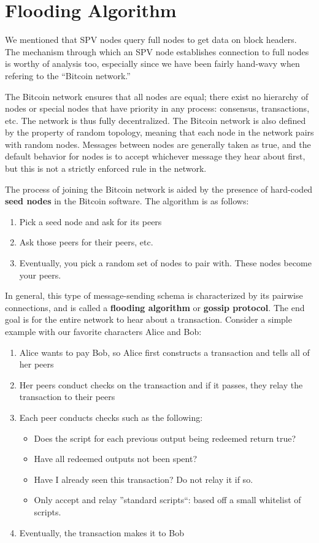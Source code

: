 \documentclass[11pt]{article}
\begin{document}
 \section*{Flooding Algorithm}
 
 We mentioned that SPV nodes query full nodes to get data on block headers. The mechanism through which an SPV node establishes connection to full nodes is worthy of analysis too, especially since we have been fairly hand-wavy when refering to the ``Bitcoin network.''
 
 The Bitcoin network ensures that all nodes are equal; there exist no hierarchy of nodes or special nodes that have priority in any process: consensus, transactions, etc. The network is thus fully decentralized. The Bitcoin network is also defined by the property of random topology, meaning that each node in the network pairs with random nodes. Messages between nodes are generally taken as true, and the default behavior for nodes is to accept whichever message they hear about first, but this is not a strictly enforced rule in the network.
 
 The process of joining the Bitcoin network is aided by the presence of hard-coded \textbf{seed nodes} in the Bitcoin software. The algorithm is as follows:
 \begin{enumerate}
     \item Pick a seed node and ask for its peers
     \item Ask those peers for their peers, etc.
     \item Eventually, you pick a random set of nodes to pair with. These nodes become your peers.
 \end{enumerate}
 
 In general, this type of message-sending schema is characterized by its pairwise connections, and is called a \textbf{flooding algorithm} or \textbf{gossip protocol}. The end goal is for the entire network to hear about a transaction. Consider a simple example with our favorite characters Alice and Bob:
 
 \begin{enumerate}
     \item Alice wants to pay Bob, so Alice first constructs a transaction and tells all of her peers
     \item Her peers conduct checks on the transaction and if it passes, they relay the transaction to their peers
     \item Each peer conducts checks such as the following: \begin{itemize}
         \item Does the script for each previous output being redeemed return true?
         \item Have all redeemed outputs not been spent?
         \item Have I already seen this transaction? Do not relay it if so.
         \item Only accept and relay ''standard scripts``: based off a small whitelist of scripts.
     \end{itemize}
     \item Eventually, the transaction makes it to Bob
 \end{enumerate}
 
\end{document}
